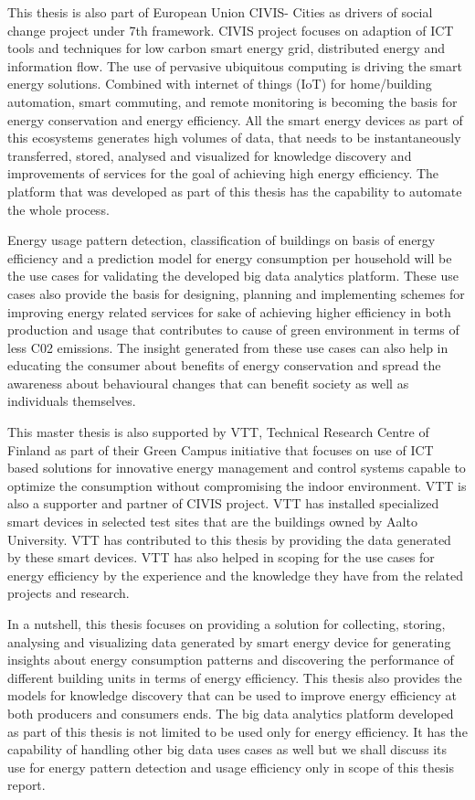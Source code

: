 This thesis is also part of European Union CIVIS- Cities as drivers of social change project under 7th framework. CIVIS project focuses on adaption of ICT tools and techniques for low carbon smart energy grid, distributed energy and information flow. The use of pervasive ubiquitous computing is driving the smart energy solutions. Combined with internet of things (IoT) for home/building automation, smart commuting, and remote monitoring is becoming the basis for energy conservation and energy efficiency. All the smart energy devices as part of this ecosystems generates high volumes of data, that needs to be instantaneously transferred, stored, analysed and visualized for knowledge discovery and  improvements of services for the goal of achieving high energy efficiency. The platform that was developed as part of this thesis has the capability to automate the whole process.
 
Energy usage pattern detection, classification of buildings on basis of energy efficiency and a prediction model for energy consumption per household will be the use cases for validating the developed big data analytics platform. These use cases also provide the basis for designing, planning and implementing schemes for improving energy related services for sake of achieving higher efficiency in both production and usage that contributes to cause of green environment in terms of less C02 emissions.  The insight generated from these use cases can also help in educating the consumer about benefits of energy conservation and spread the awareness about behavioural changes that can benefit society as well as individuals themselves. 

This master thesis is also supported by VTT, Technical Research Centre of Finland as part of their Green Campus initiative that focuses on use of ICT based solutions for innovative energy management and control systems capable to optimize the consumption without compromising the indoor environment. VTT is also a supporter and partner of CIVIS project. VTT has installed specialized smart devices in selected test sites that are the buildings owned by Aalto University. VTT has contributed to this thesis by providing the data generated by these smart devices. VTT has also helped in scoping for the use cases for energy efficiency by the experience and the knowledge they have from the related projects and research.

In a nutshell, this thesis focuses on providing a solution for collecting, storing, analysing and visualizing data generated by smart energy device for generating insights about energy consumption patterns and discovering the performance of different building units in terms of energy efficiency. This thesis also provides the models for knowledge discovery that can be used to improve energy efficiency at both producers and consumers ends. The big data analytics platform developed as part of this thesis is not limited to be used only for energy efficiency. It has the capability of handling other big data uses cases as well but we shall discuss its use for energy pattern detection and usage efficiency only in scope of this thesis report.     





